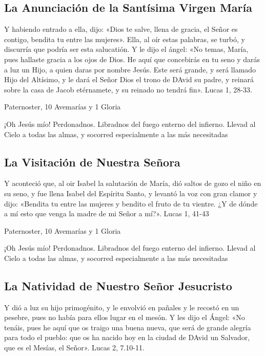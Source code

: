 \documentclass[a4paper,11pt, oneside]{report}
\begin{document}
      \subsection{La Anunciación de la Santísima Virgen María}
        Y habiendo entrado a ella, dijo: «Dios te salve, llena de gracia, el Señor es contigo, bendita tu entre las mujeres». Ella, al oír estas palabras, se turbó,
        y discurría que podría ser esta salucatión. Y le dijo el ángel: «No temas, María, pues hallaste gracia a los ojos de Dios. He aquí que concebirás en tu seno
        y darás a luz un Hijo, a quien daras por nombre Jesús. Este será grande, y será llamado Hijo del Altísimo, y le dará el Señor Dios el trono de DAvid su padre,
        y reinará sobre la casa de Jacob etérnamete, y su reinado no tendrá fin». Lucas 1, 28-33\cite{bover-cantera}.
        
        \smallskip
         Paternoster, 10 Avemarías y 1 Gloria
        
        \smallskip
        ¡Oh Jesús mío! Perdonadnos. Libradnos del fuego enterno del infierno. Llevad al Cielo a todas las almas, y socorred especialmente a las más 
        necesitadas

      \subsection{La Visitación de Nuestra Señora}
        Y aconteció que, al oir Isabel la salutación de María, dió saltos de gozo el niño en su seno, y fue llena Isabel del Espíritu Santo, y levantó la voz con gran
        clamor y dijo: «Bendita tu entre las mujeres y bendito el fruto de tu vientre. ¿Y de dónde a mí esto que venga la madre de mi Señor a mí?». 
        Lucas 1, 41-43\cite{bover-cantera}
        
        \smallskip
         Paternoster, 10 Avemarías y 1 Gloria
        
        \smallskip
        ¡Oh Jesús mío! Perdonadnos. Libradnos del fuego enterno del infierno. Llevad al Cielo a todas las almas, y socorred especialmente a las más 
        necesitadas
                      
      \subsection{La Natividad de Nuestro Señor Jesucristo}
        Y dió a luz su hijo primogénito, y le envolvió en pañales y le recostó en un pesebre, pues no había para ellos lugar en el mesón.
        Y les dijo el Ángel: «No tenáis, pues he aquí que os traigo una buena nueva, que será de grande alegría para todo el pueblo: que os ha nacido hoy en la ciudad de DAvid
        un Salvador, que es el Mesías, el Señor». Lucas 2, 7.10-11\cite{bover-cantera}.
        
\end{document}
